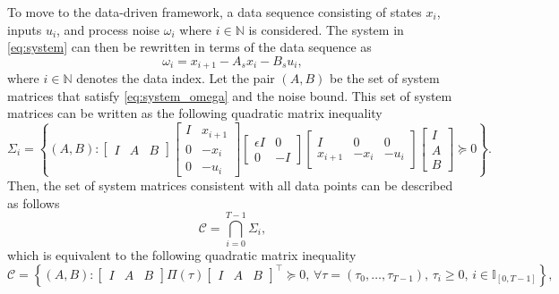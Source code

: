 To move to the data-driven framework, a data sequence consisting of states $x_i$, inputs $u_i$, and process noise $\omega_i$ where $i \in \mathbb{N}$ is considered. The system in \autoref{eq:system} can then be rewritten in terms of the data sequence as
    \begin{equation} \label{eq:system_omega}
		\omega_i = x_{i+1} - A_s x_i - B_s u_i,
	\end{equation}
where $i \in \mathbb{N}$ denotes the data index.
Let the pair \(\left(A, B\right)\) be the set of system matrices that satisfy \autoref{eq:system_omega} and the noise bound. This set of system matrices can be written as the following quadratic matrix inequality
	\begin{equation}
		\Sigma_i = \left\{ \left( A, B \right) :
		\begin{bmatrix} I & A & B \end{bmatrix}
		\begin{bmatrix}
			I & x_{i+1} \\
			0 & -x_i \\
			0 & -u_i
		\end{bmatrix}
		\begin{bmatrix}
			\epsilon I & 0 \\
			0 & -I
		\end{bmatrix}
		\begin{bmatrix}
			I & 0 & 0 \\
			x_{i+1} & -x_i & -u_i
		\end{bmatrix}
		\begin{bmatrix} I \\ A \\ B \end{bmatrix}
		\succeq 0
		\right\}.
\end{equation}
Then, the set of system matrices consistent with all data points can be described as follows
	\begin{equation}
		\mathcal{C} = \bigcap_{i=0}^{T-1} \Sigma_i,
	\end{equation}
\noindent
which is equivalent to the following quadratic matrix inequality
	\begin{equation}
		\mathcal{C} = \left\{ \left( A, B \right) :
		\begin{bmatrix} I & A & B \end{bmatrix}
		\Pi(\tau)
		\begin{bmatrix} I & A & B \end{bmatrix}^\top \succeq 0,\,
		\forall \tau = \left(\tau_0, \ldots, \tau_{T-1}\right),\, \tau_i \geq 0,\, i \in \mathbb{I}_{[0,T-1]}
		\right\},
	\end{equation}
